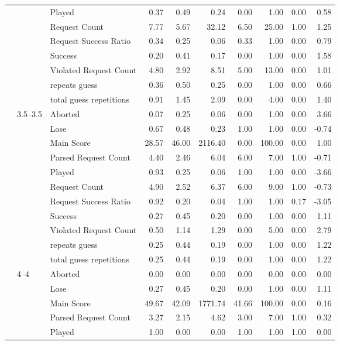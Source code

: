 \begin{tabular}{lllrrrrrrr}
 &  & Played & 0.37 & 0.49 & 0.24 & 0.00 & 1.00 & 0.00 & 0.58 \\
 &  & Request Count & 7.77 & 5.67 & 32.12 & 6.50 & 25.00 & 1.00 & 1.25 \\
 &  & Request Success Ratio & 0.34 & 0.25 & 0.06 & 0.33 & 1.00 & 0.00 & 0.79 \\
 &  & Success & 0.20 & 0.41 & 0.17 & 0.00 & 1.00 & 0.00 & 1.58 \\
 &  & Violated Request Count & 4.80 & 2.92 & 8.51 & 5.00 & 13.00 & 0.00 & 1.01 \\
 &  & repeats guess & 0.36 & 0.50 & 0.25 & 0.00 & 1.00 & 0.00 & 0.66 \\
 &  & total guess repetitions & 0.91 & 1.45 & 2.09 & 0.00 & 4.00 & 0.00 & 1.40 \\
\cline{2-10}
 & \multirow[t]{11}{*}{3.5--3.5} & Aborted & 0.07 & 0.25 & 0.06 & 0.00 & 1.00 & 0.00 & 3.66 \\
 &  & Lose & 0.67 & 0.48 & 0.23 & 1.00 & 1.00 & 0.00 & -0.74 \\
 &  & Main Score & 28.57 & 46.00 & 2116.40 & 0.00 & 100.00 & 0.00 & 1.00 \\
 &  & Parsed Request Count & 4.40 & 2.46 & 6.04 & 6.00 & 7.00 & 1.00 & -0.71 \\
 &  & Played & 0.93 & 0.25 & 0.06 & 1.00 & 1.00 & 0.00 & -3.66 \\
 &  & Request Count & 4.90 & 2.52 & 6.37 & 6.00 & 9.00 & 1.00 & -0.73 \\
 &  & Request Success Ratio & 0.92 & 0.20 & 0.04 & 1.00 & 1.00 & 0.17 & -3.05 \\
 &  & Success & 0.27 & 0.45 & 0.20 & 0.00 & 1.00 & 0.00 & 1.11 \\
 &  & Violated Request Count & 0.50 & 1.14 & 1.29 & 0.00 & 5.00 & 0.00 & 2.79 \\
 &  & repeats guess & 0.25 & 0.44 & 0.19 & 0.00 & 1.00 & 0.00 & 1.22 \\
 &  & total guess repetitions & 0.25 & 0.44 & 0.19 & 0.00 & 1.00 & 0.00 & 1.22 \\
\cline{2-10}
 & \multirow[t]{11}{*}{4--4} & Aborted & 0.00 & 0.00 & 0.00 & 0.00 & 0.00 & 0.00 & 0.00 \\
 &  & Lose & 0.27 & 0.45 & 0.20 & 0.00 & 1.00 & 0.00 & 1.11 \\
 &  & Main Score & 49.67 & 42.09 & 1771.74 & 41.66 & 100.00 & 0.00 & 0.16 \\
 &  & Parsed Request Count & 3.27 & 2.15 & 4.62 & 3.00 & 7.00 & 1.00 & 0.32 \\
 &  & Played & 1.00 & 0.00 & 0.00 & 1.00 & 1.00 & 1.00 & 0.00 \\

\end{tabular}
